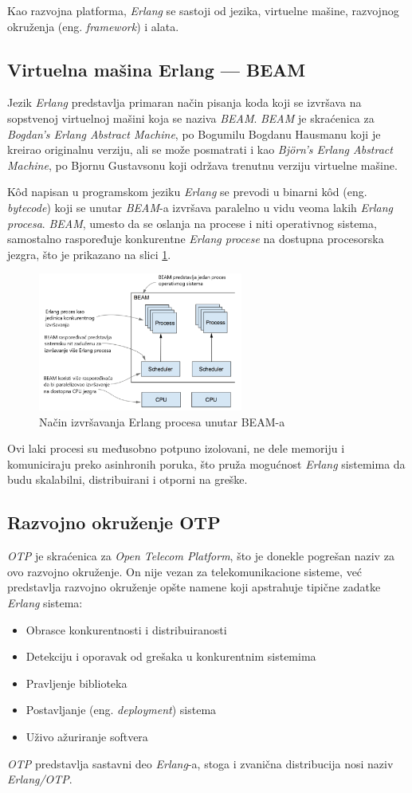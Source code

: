 \documentclass[12pt,oneside]{memoir}
\begin{document}
Kao razvojna platforma, \emph{Erlang} se sastoji od jezika, virtuelne mašine, razvojnog okruženja (eng.
\emph{framework}) i alata.
\subsection{ Virtuelna mašina Erlang --- BEAM}
Jezik \emph{Erlang} predstavlja primaran način pisanja koda koji se izvršava na sopstvenoj virtuelnoj
mašini koja se naziva \emph{BEAM}. \emph{BEAM} je skraćenica za \emph{Bogdan’s Erlang Abstract Machine}, po
Bogumilu Bogdanu Hausmanu koji je kreirao originalnu verziju, ali se može posmatrati i kao
\emph{Björn’s Erlang Abstract Machine}, po Bjornu Gustavsonu koji održava trenutnu verziju 
virtuelne mašine. 

K\^{o}d napisan u programskom jeziku \emph{Erlang} se prevodi u binarni k\^{o}d (eng. \emph{bytecode})
koji se unutar \emph{BEAM}-a izvršava paralelno u vidu veoma lakih \emph{Erlang procesa}. \emph{BEAM}, umesto 
da se oslanja na procese i niti operativnog sistema, samostalno raspoređuje konkurentne
\emph{Erlang procese} na dostupna procesorska jezgra, što je prikazano na slici \ref{fig:beam}.
\begin{figure}[h]
  \centering
  \includegraphics[width=0.6\textwidth]{beam.png}
  \caption{Način izvršavanja Erlang procesa unutar BEAM-a \cite{elixirInAction}}
  \label{fig:beam}
\end{figure}
Ovi laki procesi su međusobno potpuno izolovani, ne dele memoriju i komuniciraju preko
asinhronih poruka, što pruža mogućnost \emph{Erlang} sistemima da budu skalabilni, distribuirani i 
otporni na greške.  

\subsection{Razvojno okruženje OTP}
\emph{OTP} je skraćenica za \emph{Open Telecom Platform}, što je donekle pogrešan naziv za ovo razvojno
okruženje. On nije vezan za telekomunikacione sisteme, već predstavlja razvojno okruženje opšte namene koji
apstrahuje tipične zadatke \emph{Erlang} sistema:
\begin{itemize}
  \item Obrasce konkurentnosti i distribuiranosti
  \item Detekciju i oporavak od grešaka u konkurentnim sistemima
  \item Pravljenje biblioteka
  \item Postavljanje (eng. \emph{deployment}) sistema
  \item Uživo ažuriranje softvera 
\end{itemize}
\emph{OTP} predstavlja sastavni deo \emph{Erlang}-a, stoga i zvanična distribucija nosi naziv \emph{Erlang/OTP}.
\end{document}
